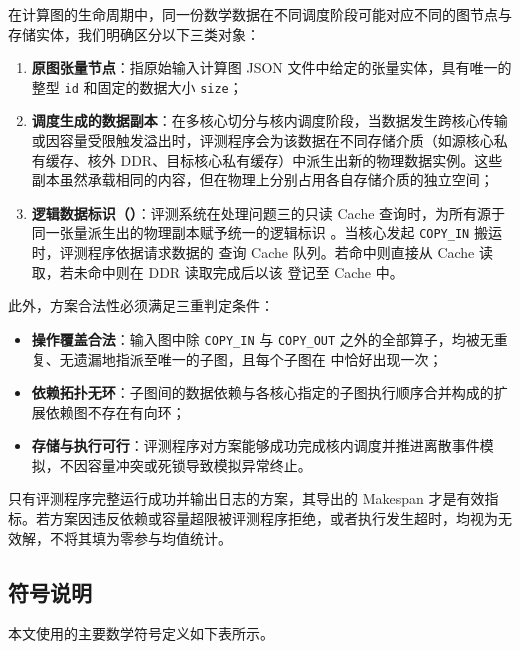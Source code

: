 \documentclass[anonymous,withtoc]{gmcm2026}
\providecommand{\tightlist}{\setlength{\itemsep}{0pt}\setlength{\parskip}{0pt}}
\begin{document}
在计算图的生命周期中，同一份数学数据在不同调度阶段可能对应不同的图节点与存储实体，我们明确区分以下三类对象：

\begin{enumerate}
\def\labelenumi{\arabic{enumi}.}
\tightlist
\item
  \textbf{原图张量节点}：指原始输入计算图 JSON 文件中给定的张量实体，具有唯一的整型 \texttt{id} 和固定的数据大小 \texttt{size}；
\item
  \textbf{调度生成的数据副本}：在多核心切分与核内调度阶段，当数据发生跨核心传输或因容量受限触发溢出时，评测程序会为该数据在不同存储介质（如源核心私有缓存、核外 DDR、目标核心私有缓存）中派生出新的物理数据实例。这些副本虽然承载相同的内容，但在物理上分别占用各自存储介质的独立空间；
\item
  \textbf{逻辑数据标识（\texttt{}）}：评测系统在处理问题三的只读 Cache 查询时，为所有源于同一张量派生出的物理副本赋予统一的逻辑标识 \texttt{}。当核心发起 \texttt{COPY\_IN} 搬运时，评测程序依据请求数据的 \texttt{} 查询 Cache 队列。若命中则直接从 Cache 读取，若未命中则在 DDR 读取完成后以该 \texttt{} 登记至 Cache 中。
\end{enumerate}

此外，方案合法性必须满足三重判定条件：

\begin{itemize}
\tightlist
\item
  \textbf{操作覆盖合法}：输入图中除 \texttt{COPY\_IN} 与 \texttt{COPY\_OUT} 之外的全部算子，均被无重复、无遗漏地指派至唯一的子图，且每个子图在 \texttt{} 中恰好出现一次；
\item
  \textbf{依赖拓扑无环}：子图间的数据依赖与各核心指定的子图执行顺序合并构成的扩展依赖图不存在有向环；
\item
  \textbf{存储与执行可行}：评测程序对方案能够成功完成核内调度并推进离散事件模拟，不因容量冲突或死锁导致模拟异常终止。
\end{itemize}

只有评测程序完整运行成功并输出日志的方案，其导出的 Makespan 才是有效指标。若方案因违反依赖或容量超限被评测程序拒绝，或者执行发生超时，均视为无效解，不将其填为零参与均值统计。

\subsection{符号说明}

本文使用的主要数学符号定义如下表所示。
\end{document}
